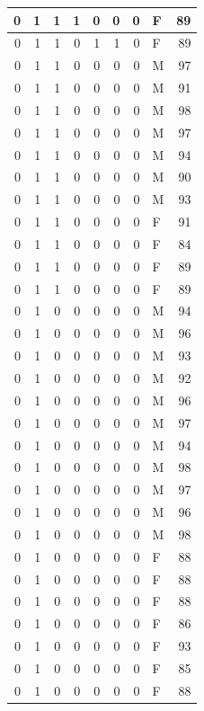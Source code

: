 \documentclass[
  12pt,
]{krantz}
\begin{document}
\begin{tabular}{r|r|r|r|r|r|r|l|r}
\hline
0 & 1 & 1 & 1 & 0 & 0 & 0 & F & 89\\
\hline
0 & 1 & 1 & 0 & 1 & 1 & 0 & F & 89\\
\hline
0 & 1 & 1 & 0 & 0 & 0 & 0 & M & 97\\
\hline
0 & 1 & 1 & 0 & 0 & 0 & 0 & M & 91\\
\hline
0 & 1 & 1 & 0 & 0 & 0 & 0 & M & 98\\
\hline
0 & 1 & 1 & 0 & 0 & 0 & 0 & M & 97\\
\hline
0 & 1 & 1 & 0 & 0 & 0 & 0 & M & 94\\
\hline
0 & 1 & 1 & 0 & 0 & 0 & 0 & M & 90\\
\hline
0 & 1 & 1 & 0 & 0 & 0 & 0 & M & 93\\
\hline
0 & 1 & 1 & 0 & 0 & 0 & 0 & F & 91\\
\hline
0 & 1 & 1 & 0 & 0 & 0 & 0 & F & 84\\
\hline
0 & 1 & 1 & 0 & 0 & 0 & 0 & F & 89\\
\hline
0 & 1 & 1 & 0 & 0 & 0 & 0 & F & 89\\
\hline
0 & 1 & 0 & 0 & 0 & 0 & 0 & M & 94\\
\hline
0 & 1 & 0 & 0 & 0 & 0 & 0 & M & 96\\
\hline
0 & 1 & 0 & 0 & 0 & 0 & 0 & M & 93\\
\hline
0 & 1 & 0 & 0 & 0 & 0 & 0 & M & 92\\
\hline
0 & 1 & 0 & 0 & 0 & 0 & 0 & M & 96\\
\hline
0 & 1 & 0 & 0 & 0 & 0 & 0 & M & 97\\
\hline
0 & 1 & 0 & 0 & 0 & 0 & 0 & M & 94\\
\hline
0 & 1 & 0 & 0 & 0 & 0 & 0 & M & 98\\
\hline
0 & 1 & 0 & 0 & 0 & 0 & 0 & M & 97\\
\hline
0 & 1 & 0 & 0 & 0 & 0 & 0 & M & 96\\
\hline
0 & 1 & 0 & 0 & 0 & 0 & 0 & M & 98\\
\hline
0 & 1 & 0 & 0 & 0 & 0 & 0 & F & 88\\
\hline
0 & 1 & 0 & 0 & 0 & 0 & 0 & F & 88\\
\hline
0 & 1 & 0 & 0 & 0 & 0 & 0 & F & 88\\
\hline
0 & 1 & 0 & 0 & 0 & 0 & 0 & F & 86\\
\hline
0 & 1 & 0 & 0 & 0 & 0 & 0 & F & 93\\
\hline
0 & 1 & 0 & 0 & 0 & 0 & 0 & F & 85\\
\hline
0 & 1 & 0 & 0 & 0 & 0 & 0 & F & 88\\

\end{tabular}
\end{document}
